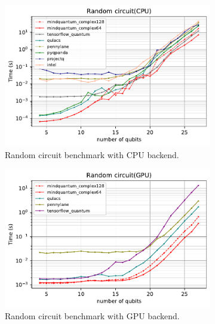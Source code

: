 \begin{figure}
    \centering
    \begin{subfigure}{0.45\textwidth}
        \centering
        \includegraphics[width=\textwidth]{images/7_Random_circuit_CPU.pdf}
        \caption{Random circuit benchmark with CPU backend.}
        \label{7_random_circ_cpu}
    \end{subfigure}
    \begin{subfigure}{0.45\textwidth}
        \centering
        \includegraphics[width=\textwidth]{images/7_Random_circuit_GPU.pdf}
        \caption{Random circuit benchmark with GPU backend.}
        \label{7_random_circ_gpu}
    \end{subfigure}
    \begin{subfigure}{0.45\textwidth}
        \centering

\end{subfigure}
\end{figure}
